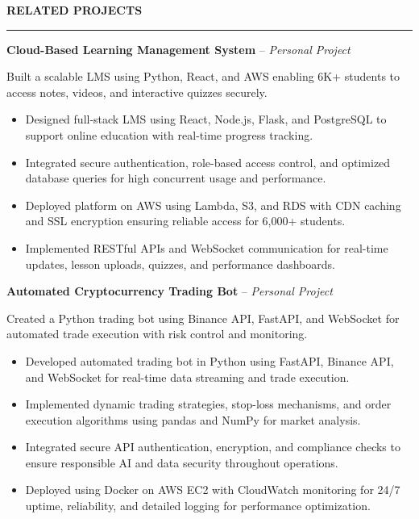 \documentclass[10pt,letterpaper]{article}
\begin{document}
\vspace{6pt}

\textbf{RELATED PROJECTS}\\[-8pt]
\noindent\rule{\textwidth}{1pt}

\vspace{-2pt}

\textbf{Cloud-Based Learning Management System} -- \emph{Personal Project}

\vspace{-1pt}

Built a scalable LMS using Python, React, and AWS enabling 6K+ students to access notes, videos, and interactive quizzes securely.
\vspace{-1pt}
\begin{itemize}
\item Designed full-stack LMS using React, Node.js, Flask, and PostgreSQL to support online education with real-time progress tracking.
\item Integrated secure authentication, role-based access control, and optimized database queries for high concurrent usage and performance.
\item Deployed platform on AWS using Lambda, S3, and RDS with CDN caching and SSL encryption ensuring reliable access for 6,000+ students.
\item Implemented RESTful APIs and WebSocket communication for real-time updates, lesson uploads, quizzes, and performance dashboards.
\end{itemize}

\textbf{Automated Cryptocurrency Trading Bot} -- \emph{Personal Project}

\vspace{-1pt}

Created a Python trading bot using Binance API, FastAPI, and WebSocket for automated trade execution with risk control and monitoring.
\vspace{-1pt}
\begin{itemize}
\item Developed automated trading bot in Python using FastAPI, Binance API, and WebSocket for real-time data streaming and trade execution.
\item Implemented dynamic trading strategies, stop-loss mechanisms, and order execution algorithms using pandas and NumPy for market analysis.
\item Integrated secure API authentication, encryption, and compliance checks to ensure responsible AI and data security throughout operations.
\item Deployed using Docker on AWS EC2 with CloudWatch monitoring for 24/7 uptime, reliability, and detailed logging for performance optimization.
\end{itemize}
\end{document}
